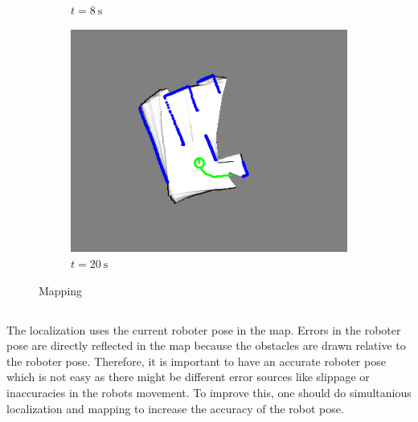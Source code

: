 \begin{figure}[H]
\begin{subfigure}{0.3\textwidth}
         \caption{$t = \SI{8}{\second}$}
         \label{mapping8s}
     \end{subfigure}
     \hfill
     \begin{subfigure}{0.3\textwidth}
         \centering
         \includegraphics[width=\textwidth]{figures/mapping_20s.png}
         \caption{$t = \SI{20}{\second}$}
         \label{mapping20s}
     \end{subfigure}
        \caption{Mapping}
        \label{fig:three graphs}
\end{figure}

\subsection{}

The localization uses the current roboter pose in the map. Errors in the roboter pose are directly reflected in the map because the obstacles are drawn relative to the roboter pose. Therefore, it is important to have an accurate roboter pose which is not easy as there might be different error sources like slippage or inaccuracies in the robots movement. To improve this, one should do simultanious localization and mapping to increase the accuracy of the robot pose. 